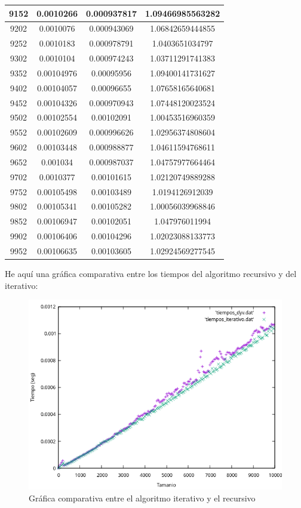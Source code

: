 \documentclass{article}
\begin{document}
\begin{longtable}{|c|c|c|c|}
		9152	&   0.0010266	  & 0.000937817	 &  1.09466985563282   \\ \hline
		9202	&   0.0010076	  & 0.000943069	 &  1.06842659444855   \\ \hline
		9252	&   0.0010183	  & 0.000978791	 &  1.0403651034797   \\ \hline
		9302	&   0.0010104	  & 0.000974243	 &  1.03711291741383   \\ \hline
		9352	&   0.00104976	  & 0.00095956	 &  1.09400141731627   \\ \hline
		9402	&   0.00104057	  & 0.00096655	 &  1.07658165640681   \\ \hline
		9452	&   0.00104326	  & 0.000970943	 &  1.07448120023524   \\ \hline
		9502	&   0.00102554	  & 0.00102091	 &  1.00453516960359   \\ \hline
		9552	&   0.00102609	  & 0.000996626	 &  1.02956374808604   \\ \hline
		9602	&   0.00103448	  & 0.000988877	 &  1.04611594768611   \\ \hline
		9652	&   0.001034	  & 0.000987037	 &  1.04757977664464   \\ \hline
		9702	&   0.0010377	  & 0.00101615	 &  1.02120749889288   \\ \hline
		9752	&   0.00105498	  & 0.00103489	 &  1.0194126912039   \\ \hline
		9802	&   0.00105341	  & 0.00105282	 &  1.00056039968846   \\ \hline
		9852	&   0.00106947	  & 0.00102051	 &  1.047976011994   \\ \hline
		9902	&   0.00106406	  & 0.00104296	 &  1.02023088133773   \\ \hline
		9952	&   0.00106635	  & 0.00103605	 &  1.02924569277545   \\ \hline
	\end{longtable}
	He aquí una gráfica comparativa entre los tiempos del algoritmo recursivo y del iterativo:
	\begin{figure}[H]
		\centering
		\includegraphics[totalheight=8cm]{img/iterativo_recursivo}
		\caption{Gráfica comparativa entre el algoritmo iterativo y el recursivo}
		\label{fig:iterativo_recursivo}
	\end{figure}
\end{document}
